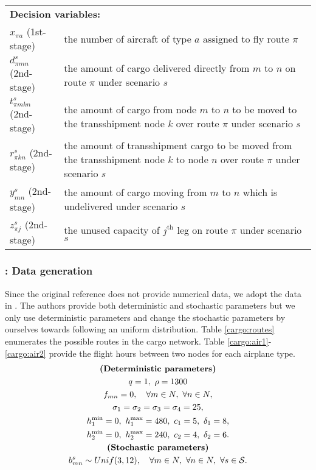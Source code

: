 \begin{table}[H]
{\begin{tabular}{ll}
			\multicolumn{2}{l}{\textbf{Decision variables:}} \\
			$x_{\pi a}$ (1st-stage) & the number of aircraft of type $a$ assigned to fly route $\pi$\\
			$d_{\pi mn}^s$ (2nd-stage)& the amount of cargo delivered directly from $m$ to $n$ on route $\pi$ under scenario $s$\\
			$t_{\pi m k n}^s$ (2nd-stage)& the amount of cargo from node $m$ to $n$ to be moved to the transshipment node $k$ over route $\pi$ under scenario $s$\\
			$r_{\pi kn}^s$ (2nd-stage)& the amount of transshipment cargo to be moved from the transshipment node $k$ to node $n$ over route $\pi$ under scenario $s$\\
			$y_{mn}^s$ (2nd-stage)& the amount of cargo moving from $m$ to $n$ which is undelivered under scenario $s$\\
			$z_{\pi j}^s$ (2nd-stage)& the unused capacity of $j^{\textrm{th}}$ leg on route $\pi$ under scenario $s$\\ 
			\bottomrule
		\end{tabular}
	}
\end{table} 

\subsubsection{\cargo: Data generation}
Since the original reference \cite{journal:MR1995} does not provide numerical data, we adopt the data in \cite{journal:AF2004}. The authors provide both deterministic and stochastic parameters but we only use deterministic parameters and change the stochastic parameters by ourselves towards following an uniform distribution. Table \ref{cargo:routes} enumerates the possible routes in the cargo network. Table \ref{cargo:air1}-\ref{cargo:air2} provide the flight hours between two nodes for each airplane type.
\begin{gather*}
\textbf{\textrm{(Deterministic parameters)}}\\
q=1,\ \rho=1300\\
f_{mn}=0,\quad\forall m\in N,\ \forall n\in N,\\
\sigma_1=\sigma_2=\sigma_3=\sigma_4=25,\\
h_1^{\textrm{min}}=0,\ h_1^{\textrm{max}}=480,\ c_1=5,\ \delta_1=8,\\
h_2^{\textrm{min}}=0,\ h_2^{\textrm{max}}=240,\ c_2=4,\ \delta_2=6.\\
\textbf{\textrm{(Stochastic parameters)}}\\
b_{mn}^s\sim Unif(3,12),\quad\forall m\in N,\ \forall n\in N,\ \forall s\in\mathcal{S}.
\end{gather*}

